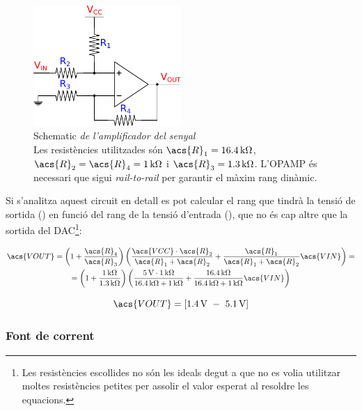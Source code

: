 \begin{figure}[htp]
	\centering
	\includegraphics[width=0.5\textwidth]{Figures/schematic_amplificador.pdf}
	\caption[Amplificador del senyal]{Schematic\textit{ de l'amplificador del senyal}\\{\footnotesize Les resistències utilitzades són $ \acs{R}_1=\SI{16.4}{\kilo\ohm} $, $ \acs{R}_2 = \acs{R}_4 =\SI{1}{\kilo\ohm} $ i $ \acs{R}_3=\SI{1.3}{\kilo\ohm} $. L'\ac{OPAMP} és necessari que sigui \textit{rail-to-rail} per garantir el màxim rang dinàmic.}}
	\label{fig:schematic_amplificador}
\end{figure}

Si s'analitza aquest circuit en detall es pot calcular el rang que tindrà la tensió de sortida () en funció del rang de la tensió d'entrada (), que no és cap altre que la sortida del \ac{DAC}\footnote{Les resistències escollides no són les ideals degut a que no es volia utilitzar moltes resistències petites per assolir el valor esperat al resoldre les equacions.}:

\begin{multline}
\acs{VOUT} = \left(1 + \frac{\acs{R}_4}{\acs{R}_3}\right) \left(\frac{\acs{VCC}\cdot \acs{R}_2}{\acs{R}_1 + \acs{R}_2} + \frac{\acs{R}_1}{\acs{R}_1 + \acs{R}_2} \acs{VIN}\right) =\\=\left(1 + \frac{\SI{1}{\kilo\ohm}}{\SI{1.3}{\kilo\ohm}}\right) \left(\frac{\SI{5}{\volt}\cdot \SI{1}{\kilo\ohm}}{\SI{16.4}{\kilo\ohm} + \SI{1}{\kilo\ohm}} + \frac{\SI{16.4}{\kilo\ohm}}{\SI{16.4}{\kilo\ohm} + \SI{1}{\kilo\ohm}} \acs{VIN}\right)
\end{multline}

\begin{equation}
\acs{VOUT} = \left[\SIrange[range-phrase = \ -\ ]{1.4}{5.1}{\volt}\right]
\end{equation}

\subsubsection{Font de corrent}

